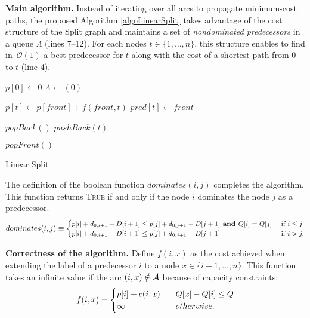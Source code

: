 \documentclass[11pt]{article}
\newcommand{\cO}{{\mathcal O}}
\newcommand{\cA}{{\cal A}}
\newcommand{\blue}[1]{{#1}}
\begin{document}
\noindent
\textbf{Main algorithm.}  \blue{Instead of iterating over all arcs to propagate minimum-cost paths, the proposed Algorithm \ref{algoLinearSplit} takes advantage of the cost structure of the Split graph and maintains a set of \emph{nondominated predecessors} in a queue $\Lambda$ (lines 7--12). For each nodes $t \in \{1,\dots,n\}$, this structure enables to find in~$\cO(1)$ a best predecessor for $t$ along with the cost of a shortest path from $0$ to $t$ (line 4).}

\begin{algorithm}[htb]

$p[0] \gets 0$ \;
$\Lambda \gets  (0)$ \;
{ 

  	$p[t] \gets p[front] + f(front,t)$ \;   \label{linearSplitPropagate}
  	$pred[t] \gets front $ \;


	{
		{
	  		{ $popBack()$ \; }
			$pushBack(t)$
		}


  		{ $popFront()$ \; }
	}
}
 \caption{Linear Split} 
\label{algoLinearSplit} 
\end{algorithm}

The definition of the boolean function $dominates(i,j)$ completes the algorithm. \blue{This function returns \textsc{True} if and only if the node $i$ dominates the node $j$ as a predecessor.}
\begin{equation}
\begin{small}
dominates(i,j) \equiv
\begin{cases}
p[i] +d_{0,i+1} - D[i+1] \leq p[j] + d_{0,j+1} - D[j+1]   \textbf{ and } Q[i] = Q[j]  & \text{ if } i \leq j \\
p[i] + d_{0,i+1} - D[i+1] \leq  p[j] + d_{0,j+1} - D[j+1] & \text{ if } i > j. \\
\end{cases} 
\end{small}
\label{dominatesFunctionHard}
\end{equation}

\noindent
\textbf{Correctness of the algorithm.}
Define $f(i,x)$ as the cost achieved when extending the label of a predecessor $i$ to a node $x \in \{i+1, \dots, n\}$. This function takes an infinite value if the arc $(i,x) \notin \cA$ because of capacity constraints:
\begin{equation*}
f(i,x) =
\begin{cases}
p[i] + c(i,x)  & \hspace*{0.3cm}  Q[x] - Q[i] \leq Q \\ \infty & \hspace*{0.3cm} otherwise.
\end{cases} 
\end{equation*}
\end{document}

